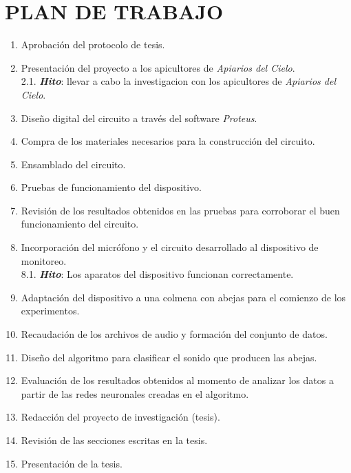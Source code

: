 \documentclass[12pt]{report}
\begin{document}
	
	\chapter{PLAN DE TRABAJO}
	
	\begin{enumerate}
		\item Aprobación del protocolo de tesis.
		\item Presentación del proyecto a los apicultores de \textit{Apiarios del Cielo}. \\[0.5ex]
		2.1. \textbf{\textit{Hito}}: llevar a cabo la investigacion con los apicultores de \textit{Apiarios del Cielo}.
		\item Diseño digital del circuito a través del software \textit{Proteus}.
		\item Compra de los materiales necesarios para la construcción del circuito.
		\item Ensamblado del circuito.
		\item Pruebas de funcionamiento del dispositivo.
		\item Revisión de los resultados obtenidos en las pruebas para corroborar el buen funcionamiento del circuito. 
		\item Incorporación del micrófono y el circuito desarrollado al dispositivo de monitoreo. \\[0.5ex]
		8.1. \textbf{\textit{Hito}}: Los aparatos del dispositivo funcionan correctamente.
		\item Adaptación del dispositivo a una colmena con abejas para el comienzo de los experimentos.
		\item Recaudación de los archivos de audio y formación del conjunto de datos.
		\item Diseño del algoritmo para clasificar el sonido que producen las abejas.
		\item Evaluación de los resultados obtenidos al momento de analizar los datos a partir de las redes neuronales creadas en el algoritmo.
		\item Redacción del proyecto de investigación (tesis).
		\item Revisión de las secciones escritas en la tesis.
		\item Presentación de la tesis.
	\end{enumerate}
\end{document}
